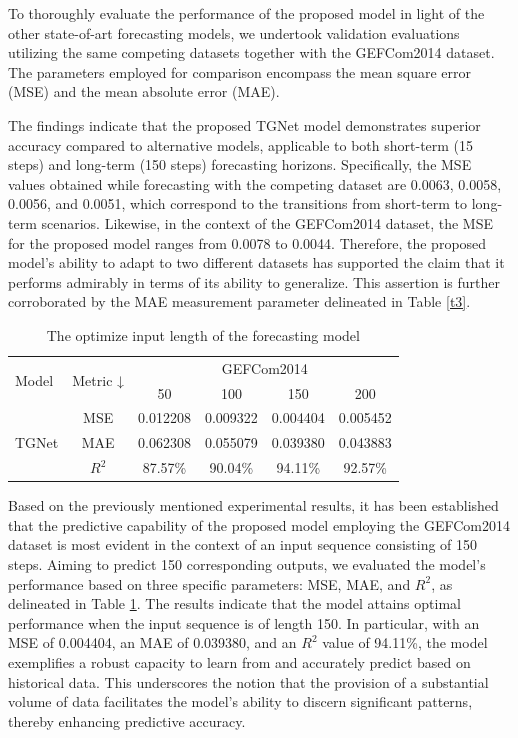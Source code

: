 \documentclass[sn-mathphys-num]{sn-jnl}%
\begin{document}
To thoroughly evaluate the performance of the proposed model in light of the other state-of-art forecasting models, we undertook validation evaluations utilizing the same competing datasets together with the GEFCom2014 dataset. The parameters employed for comparison encompass the mean square error (MSE) and the mean absolute error (MAE).

The findings indicate that the proposed TGNet model demonstrates superior accuracy compared to alternative models, applicable to both short-term (15 steps) and long-term (150 steps) forecasting horizons. Specifically, the MSE values obtained while forecasting with the competing dataset are 0.0063, 0.0058, 0.0056, and 0.0051, which correspond to the transitions from short-term to long-term scenarios. Likewise, in the context of the GEFCom2014 dataset, the MSE for the proposed model ranges from 0.0078 to 0.0044. Therefore, the proposed model's ability to adapt to two different datasets has supported the claim that it performs admirably in terms of its ability to generalize. This assertion is further corroborated by the MAE measurement parameter delineated in Table \ref{t3}.
\begin{table}[ht!]
    \centering
    \caption{The optimize input length of the  forecasting model}
    \begin{tabular}{|l|c|c|c|c|c|}
        \toprule
        \multirow{2}{*}{Model} & \multirow{2}{*}{Metric ↓} & \multicolumn{4}{c|}{GEFCom2014} \\
        \cmidrule{3-6}
        & & 50 & 100 & 150 & 200 \\
        \midrule
        \multirow{3}{*}{TGNet} & MSE & 0.012208 & 0.009322 & \cellcolor{yellow}0.004404 & 0.005452 \\
        & MAE & 0.062308 & 0.055079 & \cellcolor{yellow}0.039380 & 0.043883 \\
        & $R^2$ & 87.57\% & 90.04\% & \cellcolor{yellow}94.11\% & 92.57\% \\        
        \bottomrule 
    \end{tabular}
    \label{t4}
\end{table}


Based on the previously mentioned experimental results, it has been established that the predictive capability of the proposed model employing the GEFCom2014 dataset is most evident in the context of an input sequence consisting of 150 steps. Aiming to predict 150 corresponding outputs, we evaluated the model's performance based on three specific parameters: MSE, MAE, and $R^2$, as delineated in Table \ref{t4}. The results indicate that the model attains optimal performance when the input sequence is of length 150. In particular, with an MSE of 0.004404, an MAE of 0.039380, and an $R^2$ value of 94.11\%, the model exemplifies a robust capacity to learn from and accurately predict based on historical data. This underscores the notion that the provision of a substantial volume of data facilitates the model's ability to discern significant patterns, thereby enhancing predictive accuracy.
\end{document}
